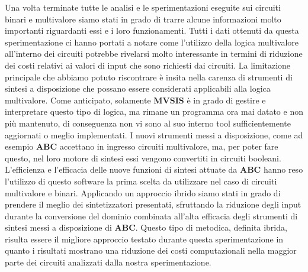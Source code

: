 \documentclass[
  italian,
]{book}
\begin{document}
Una volta terminate tutte le analisi e le sperimentazioni eseguite sui circuiti binari e multivalore siamo stati in grado di trarre alcune informazioni molto importanti riguardanti essi e i loro funzionamenti. Tutti i dati ottenuti da questa sperimentazione ci hanno portati a notare come l'utilizzo della logica multivalore all'interno dei circuiti potrebbe rivelarsi molto interessante in termini di riduzione dei costi relativi ai valori di input che sono richiesti dai circuiti. La limitazione principale che abbiamo potuto riscontrare è insita nella carenza di strumenti di sintesi a disposizione che possano essere considerati applicabili alla logica multivalore. Come anticipato, solamente \textbf{MVSIS} è in grado di gestire e interpretare questo tipo di logica, ma rimane un programma ora mai datato e non più mantenuto, di conseguenza non vi sono al suo interno tool sufficientemente aggiornati o meglio implementati. I nuovi strumenti messi a disposizione, come ad esempio \textbf{ABC} accettano in ingresso circuiti multivalore, ma, per poter fare questo, nel loro motore di sintesi essi vengono convertiti in circuiti booleani. L'efficienza e l'efficacia delle nuove funzioni di sintesi attuate da \textbf{ABC} hanno reso l'utilizzo di questo software la prima scelta da utilizzare nel caso di circuiti multivalore e binari. Applicando un approccio ibrido siamo stati in grado di prendere il meglio dei sintetizzatori presentati, sfruttando la riduzione degli input durante la conversione del dominio combinata all'alta efficacia degli strumenti di sintesi messi a disposizione di \textbf{ABC}. Questo tipo di metodica, definita ibrida, risulta essere il migliore approccio testato durante questa sperimentazione in quanto i risultati mostrano una riduzione dei costi computazionali nella maggior parte dei circuiti analizzati dalla nostra sperimentazione.

  
\end{document}
